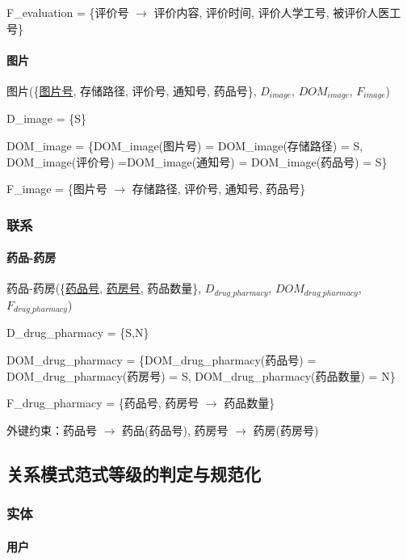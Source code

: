\documentclass{article}
\begin{document}
F\_evaluation = \{评价号 $\rightarrow$ 评价内容, 评价时间, 评价人学工号, 被评价人医工号\}

\paragraph{图片}

图片(\{\underline{图片号}, 存储路径, 评价号, 通知号, 药品号\}, $D_{image}$, $DOM_{image}$, $F_{image}$)

D\_image = \{S\}

DOM\_image = \{DOM\_image(图片号) = DOM\_image(存储路径) = S, DOM\_image(评价号) =\newline DOM\_image(通知号) = DOM\_image(药品号) = S\}

F\_image = \{图片号 $\rightarrow$ 存储路径, 评价号, 通知号, 药品号\}

\subsubsection{联系}

\paragraph{药品-药房}

药品-药房(\{\underline{药品号}, \underline{药房号}, 药品数量\}, $D_{drug\_pharmacy}$, $DOM_{drug\_pharmacy}$, $F_{drug\_pharmacy}$)

D\_drug\_pharmacy = \{S,N\}

DOM\_drug\_pharmacy = \{DOM\_drug\_pharmacy(药品号) = DOM\_drug\_pharmacy(药房号) = S, \newline DOM\_drug\_pharmacy(药品数量) = N\}

F\_drug\_pharmacy = \{药品号, 药房号 $\rightarrow$ 药品数量\}

外键约束：药品号 $\rightarrow$ 药品(药品号), 药房号 $\rightarrow$ 药房(药房号)

\subsection{关系模式范式等级的判定与规范化}

\subsubsection{实体}

\paragraph{用户}
\end{document}
